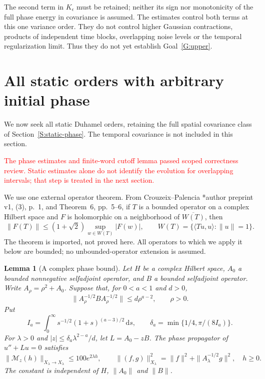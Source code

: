 \documentclass[12pt]{article}
\numberwithin{equation}{section}
\newtheorem{lemma}[theorem]{Lemma}
\theoremstyle{definition}
\newcommand{\ud}{\,\mathrm{d}}
\newcommand{\myCmts}[1]{\begin{framed}\noindent\textcolor{red}{#1}\end{framed}}
\begin{document}
The second term in $K_\epsilon$ must be retained; neither its sign nor
monotonicity of the full phase energy in covariance is assumed. The estimates
control both terms at this one variance order. They do not control higher
Gaussian contractions, products of independent time blocks, overlapping
noise levels or the temporal regularization limit. Thus they do not yet
establish Goal~\ref{G:upper}.

\section{All static orders with arbitrary initial phase}
\label{S:static-all-orders}

We now seek all static Duhamel orders, retaining the full spatial
covariance class of Section~\ref{S:static-phase}. The temporal
covariance is not included in this section.
\myCmts{The phase estimates and finite-word cutoff lemma passed scoped
correctness review. Static estimates alone do not identify the evolution
for overlapping intervals; that step is treated in the next section.}

We use one external operator theorem. From Crouzeix--Palencia
\cite{crouzeix.palencia:source2017:numerical}*{author preprint v1,
(3), p.~1, and Theorem~6, pp.~5--6}, if $T$ is a bounded operator on a
complex Hilbert space and $F$ is holomorphic on a neighborhood of
$\overline{W(T)}$, then
\begin{equation}\label{E:cp-input}
  \|F(T)\|\le(1+\sqrt2)\sup_{w\in W(T)}|F(w)|,\qquad
  W(T)=\{\langle Tu,u\rangle:\|u\|=1\}.
\end{equation}
The theorem is imported, not proved here. All operators to which we
apply it below are bounded; no unbounded-operator extension is assumed.

\begin{lemma}[A complex phase bound]\label{L:complex-phase}
  Let $H$ be a complex Hilbert space, $A_0$ a bounded nonnegative
  selfadjoint operator, and $B$ a bounded selfadjoint operator.
  Write $A_\rho=\rho^2+A_0$. Suppose that, for $0<a<1$ and $d>0$,
  \begin{equation}\label{E:abstract-sandwich}
    \|A_\rho^{-1/2}BA_\rho^{-1/2}\|\le d\rho^{a-2},
    \qquad \rho>0.
  \end{equation}
  Put
  \[
    I_a=\int_0^\infty s^{-1/2}(1+s)^{(a-3)/2}\ud s,\qquad
    \delta_a=\min\{1/4,\pi/(8I_a)\}.
  \]
  For $\lambda>0$ and $|z|\le\delta_a\lambda^{2-a}/d$, let
  $L=A_0-zB$. The phase propagator of $u''+Lu=0$ satisfies
  \begin{equation}\label{E:complex-phase-bound}
    \|\mathcal M_z(h)\|_{X_\lambda\to X_\lambda}
    \le100e^{2\lambda h},\qquad
    \|(f,g)\|_{X_\lambda}^2
    =\|f\|^2+\|A_\lambda^{-1/2}g\|^2,\quad h\ge0.
  \end{equation}
  The constant is independent of $H$, $\|A_0\|$ and $\|B\|$.
\end{lemma}
\end{document}
